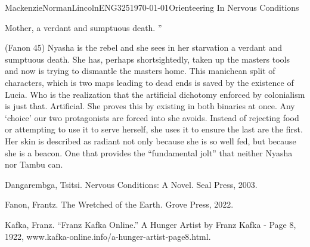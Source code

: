 \documentclass{article}
\begin{document}
\begin{mla}{Mackenzie}{Norman}{Lincoln}{ENG325}{\today}{Orienteering In Nervous Conditions}
\begin{center}
   Mother, a verdant and sumptuous death.
'' 
\end{center} (Fanon 45)
Nyasha is the rebel and she sees in her starvation a verdant and sumptuous death. She has, perhaps shortsightedly, taken up the masters tools and now is trying to dismantle the masters home. This manichean split of characters, which is two maps leading to dead ends is saved by the existence of Lucia. Who is the realization that the artificial dichotomy enforced by colonialism is just that. Artificial. She proves this by existing in both binaries at once. Any `choice' our two protagonists are forced into she avoids. Instead of rejecting food or attempting to use it to serve herself, she uses it to ensure the last are the first. Her skin is described as radiant not only because she is so well fed, but because she is a beacon. One that provides the ``fundamental jolt'' that neither Nyasha nor Tambu can.


\begin{workscited} 

    \bibent 
    Dangarembga, Tsitsi. Nervous Conditions: A Novel. Seal Press, 2003. 

    \bibent 
    Fanon, Frantz. The Wretched of the Earth. Grove Press, 2022. 

    \bibent 
    Kafka, Franz. “Franz Kafka Online.” A Hunger Artist by Franz Kafka - Page 8, 1922, www.kafka-online.info/a-hunger-artist-page8.html. 

\end{workscited}

\end{mla}
\end{document}

